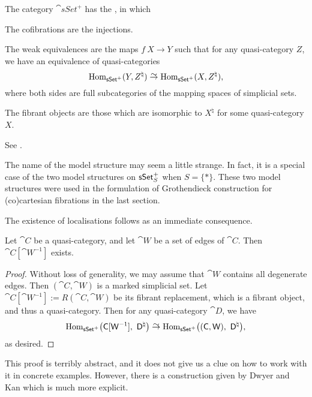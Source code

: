 \begin{theorem}
    The category $\cat{sSet}^+$ has the , in which
    \begin{itms}
        \item The cofibrations are the injections.
        \item The weak equivalences are the maps $f\:X\to Y$
        such that for any quasi-category $Z$, we have an equivalence of quasi-categories
        \[ \Hom_{\cat{sSet}^+}(Y,Z^\natural) \simto \Hom_{\cat{sSet}^+}(X,Z^\natural), \]
        where both sides are full subcategories of the mapping spaces of simplicial sets.
        \item The fibrant objects are those which are isomorphic to $X^\natural$
        for some quasi-category $X$.
    \end{itms}
\end{theorem}

See \cite[Proposition~3.1.3.7]{htt}.

The name of the model structure may seem a little strange.
In fact, it is a special case of the two model structures on $\mathsf{sSet}^+_{\smash{\/}S}$
when $S=\{*\}$. These two model structures were used in the formulation 
of Grothendieck construction for (co)cartesian fibrations in the last section.

The existence of localisations follows as an immediate consequence.

\begin{corollary}
    Let $\cat{C}$ be a quasi-category,
    and let $\cat{W}$ be a set of edges of $\cat{C}$.
    Then $\cat{C}[\cat{W}^{-1}]$ exists.
\end{corollary}

\begin{proof}
    Without loss of generality, we may assume that $\cat{W}$ contains all degenerate edges.
    Then $(\cat{C},\cat{W})$ is a marked simplicial set.
    Let $\cat{C}[\cat{W}^{-1}]:=R(\cat{C},\cat{W})$ be its fibrant replacement,
    which is a fibrant object, and thus a quasi-category.
    Then for any quasi-category $\cat{D}$, we have 
    \[ \Hom_{\cat{sSet}^+}\bigl(\cat{C}[\cat{W}^{-1}],\ \cat{D}^\natural\bigr) \simto
       \Hom_{\cat{sSet}^+}\bigl((\cat{C},\cat{W}),\ \cat{D}^\natural\bigr), \]
    as desired.
\end{proof}

This proof is terribly abstract, and it does not give us a clue on 
how to work with it in concrete examples.
However, there is a construction given by Dwyer and Kan \cite{dk-calc} which is 
much more explicit.


